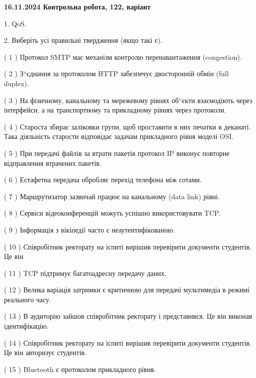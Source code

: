 \documentclass[12pt, ukrainian]{article}
\begin{document}
\vspace{4mm}
\newpage
\begin {large}

\textbf{16.11.2024 Контрольна робота, 122, варіант  }\par


{
1. QoS.



\vspace{5mm}
2. Виберіть усі правильні твердження (якщо такі є).\par
\vspace{2mm}

( 1 ) Протокол SMTP має механізм контролю перенавантаження (congestion).

( 2 ) З“єднання за протоколом  HTTP забезпечує двосторонній обмін (full duplex).

( 3 ) На фізичному, канальному та мережевому рівнях об“єкти взаємодіють через інтерфейси, а на транспортному та прикладному рівнях через протоколи.

( 4 ) Староста збирає заліковки групи, щоб проставити в них печатки в деканаті. Така діяльність старости відповідає задачам прикладного рівня моделі OSI.

( 5 ) При передачі файлів за втрати пакетів протокол IP виконує повторне відправлення втрачених пакетів.

( 6 ) Естафетна передача обробляє перехід телефона між сотами.

( 7 ) Маршрутизатор зазвичай працює на канальному (data link) рівні.

( 8 ) Сервіси відеоконференцій можуть успішно використовувати TCP.

( 9 ) Інформація з вікіпедії часто є неаутентифікованою.

( 10 ) Співробітник ректорату на іспиті вирішив перевірити документи студентів. Це він

( 11 ) TCP підтримує багатоадресну передачу даних.

( 12 ) Велика варіація затримки є критичною для передачі мультимедіа в режимі реального часу.

( 13 ) В аудиторію зайшов співробітник ректорату і представився. Це він виконав ідентифікацію.

( 14 ) Співробітник ректорату на іспиті вирішив перевірити документи студентів. Це він авторизує студентів.

( 15 ) Bluetooth є протоколом прикладного рівня.
}
\end {large}
\end{document}
